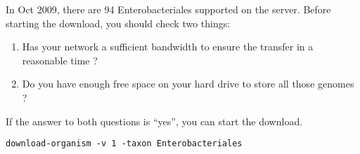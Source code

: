 In Oct 2009, there are 94 Enterobacteriales supported on the \RSAT
server. Before starting the download, you should check two things:
\begin{enumerate}
\item Has your network a sufficient bandwidth to ensure the transfer
  in a reasonable time ?
\item Do you have enough free space on your hard drive to store all those genomes ? 
\end{enumerate}

If the answer to both questions is ``yes'', you can start the
download.

\begin{footnotesize}
\begin{verbatim}
download-organism -v 1 -taxon Enterobacteriales 
\end{verbatim}
\end{footnotesize}
